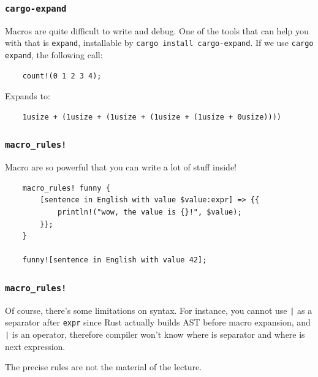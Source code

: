 \documentclass[aspectratio=1610,t]{beamer}
\begin{document}
\begin{frame}[fragile]
\frametitle{\texttt{cargo-expand}}
Macros are quite difficult to write and debug. One of the tools that can help you with that is \texttt{expand}, installable by \texttt{cargo install cargo-expand}. If we use \texttt{cargo expand}, the following call:

\begin{verbatim}
    count!(0 1 2 3 4);
\end{verbatim}

Expands to:

\begin{verbatim}
    1usize + (1usize + (1usize + (1usize + (1usize + 0usize))))
\end{verbatim}
\end{frame}


\begin{frame}[fragile]
\frametitle{\texttt{macro\_rules!}}
Macro are so powerful that you can write a lot of stuff inside!

\begin{verbatim}
    macro_rules! funny {
        [sentence in English with value $value:expr] => {{
            println!("wow, the value is {}!", $value);
        }};
    }

    funny![sentence in English with value 42];
\end{verbatim}
\end{frame}


\begin{frame}[fragile]
\frametitle{\texttt{macro\_rules!}}
Of course, there's some limitations on syntax. For instance, you cannot use \texttt{|} as a separator after \texttt{expr} since Rust actually builds AST before macro expansion, and \texttt{|} is an operator, therefore compiler won't know where is separator and where is next expression.

The precise rules are not the material of the lecture.
\end{frame}

\end{document}
